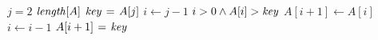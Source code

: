   \begin{codebox}
    \li \For $j = 2$ \To $\id{length}[A]$       
    \li \Do $\id{key} \gets A[j]$               
    \li   $i \gets j-1$                         
    \li   \While $i > 0 \land A[i] > \id{key}$  
    \li    \Do $A[i+1] \gets A[i]$              
    \li     $i \gets i - 1$                     
          \End
    \li   $A[i+1] \gets \id{key}$               
        \End
  \end{codebox}

